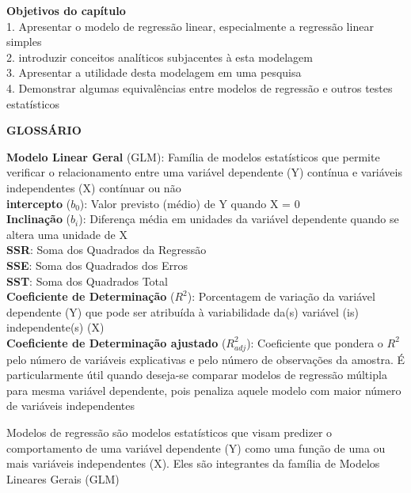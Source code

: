 \documentclass[
]{book}
\newenvironment{objectives}{
  \definecolor{shadecolor}{rgb}{0, 0, 0}  %
  \color{white}
  \begin{shaded}}
 {\end{shaded}}
\newenvironment{writing}{
  \definecolor{shadecolor}{rgb}{0, 0, 0}  %
  \color{white}
  \begin{shaded}}
 {\end{shaded}}
\begin{document}
\begin{objectives}

\textbf{Objetivos do capítulo}\\
1. Apresentar o modelo de regressão linear, especialmente a regressão linear simples\\
2. introduzir conceitos analíticos subjacentes à esta modelagem\\
3. Apresentar a utilidade desta modelagem em uma pesquisa\\
4. Demonstrar algumas equivalências entre modelos de regressão e outros testes estatísticos

\end{objectives}

\begin{writing}

\textbf{GLOSSÁRIO}

\textbf{Modelo Linear Geral} (GLM): Família de modelos estatísticos que permite verificar o relacionamento entre uma variável dependente (Y) contínua e variáveis independentes (X) contínuar ou não\\
\textbf{intercepto} (\(b_0\)): Valor previsto (médio) de Y quando X = 0\\
\textbf{Inclinação} (\(b_i\)): Diferença média em unidades da variável dependente quando se altera uma unidade de X\\
\textbf{SSR}: Soma dos Quadrados da Regressão\\
\textbf{SSE}: Soma dos Quadrados dos Erros\\
\textbf{SST}: Soma dos Quadrados Total\\
\textbf{Coeficiente de Determinação} (\(R^2\)): Porcentagem de variação da variável dependente (Y) que pode ser atribuída à variabilidade da(s) variável (is) independente(s) (X)\\
\textbf{Coeficiente de Determinação ajustado} (\(R^2_{adj}\)): Coeficiente que pondera o \(R^2\) pelo número de variáveis explicativas e pelo número de observações da amostra. É particularmente útil quando deseja-se comparar modelos de regressão múltipla para mesma variável dependente, pois penaliza aquele modelo com maior número de variáveis independentes

\end{writing}

Modelos de regressão são modelos estatísticos que visam predizer o comportamento de uma variável dependente (Y) como uma função de uma ou mais variáveis independentes (X). Eles são integrantes da família de Modelos Lineares Gerais (GLM)
\end{document}
